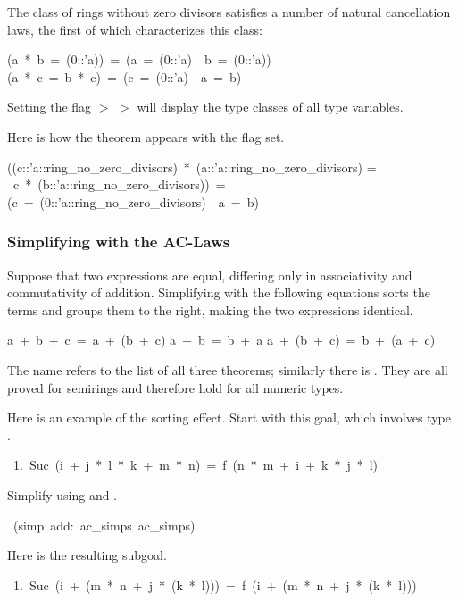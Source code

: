 The class  of rings without zero divisors satisfies a number of natural cancellation laws, the first of which characterizes this class:
\begin{isabelle}
(a\ *\ b\ =\ (0::'a))\ =\ (a\ =\ (0::'a)\ \isasymor \ b\ =\ (0::'a))
\isanewline
(a\ *\ c\ =\ b\ *\ c)\ =\ (c\ =\ (0::'a)\ \isasymor \ a\ =\ b)
\end{isabelle}
\begin{pgnote}
Setting the flag  $>$  $>$
 will display the type classes of all type variables.
\end{pgnote}
\noindent
Here is how the theorem  appears with the flag set.
\begin{isabelle}
((c::'a::ring_no_zero_divisors)\ *\ (a::'a::ring_no_zero_divisors) =\isanewline
\ c\ *\ (b::'a::ring_no_zero_divisors))\ =\isanewline
(c\ =\ (0::'a::ring_no_zero_divisors)\ \isasymor\ a\ =\ b)
\end{isabelle}


\subsubsection{Simplifying with the AC-Laws}
Suppose that two expressions are equal, differing only in
associativity and commutativity of addition.  Simplifying with the
following equations sorts the terms and groups them to the right, making
the two expressions identical.
\begin{isabelle}
a\ +\ b\ +\ c\ =\ a\ +\ (b\ +\ c)
\isanewline
a\ +\ b\ =\ b\ +\ a%
\isanewline
a\ +\ (b\ +\ c)\ =\ b\ +\ (a\ +\ c)
\end{isabelle}
The name 
refers to the list of all three theorems; similarly
there is .
They are all proved for semirings and therefore hold for all numeric types.

Here is an example of the sorting effect.  Start
with this goal, which involves type .
\begin{isabelle}
\ 1.\ Suc\ (i\ +\ j\ *\ l\ *\ k\ +\ m\ *\ n)\ =\
f\ (n\ *\ m\ +\ i\ +\ k\ *\ j\ *\ l)
\end{isabelle}
%
Simplify using   and .
\begin{isabelle}
\ (simp\ add:\ ac_simps\ ac_simps)
\end{isabelle}
%
Here is the resulting subgoal.
\begin{isabelle}
\ 1.\ Suc\ (i\ +\ (m\ *\ n\ +\ j\ *\ (k\ *\ l)))\
=\ f\ (i\ +\ (m\ *\ n\ +\ j\ *\ (k\ *\ l)))%
\end{isabelle}


